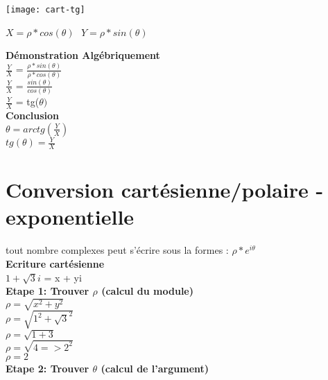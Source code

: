 \texttt{[image: cart-tg]}

$X=\rho * cos(\theta)$ $ $ $ Y=\rho * sin(\theta)$

\vspace{5mm} %
\textbf{Démonstration Algébriquement} \\

$\frac{Y}{X}$ = $\frac{\rho * sin(\theta)}{\rho * cos(\theta)}$ \\
$\frac{Y}{X}$ = $\frac{sin(\theta)}{cos(\theta)}$ \\
$\frac{Y}{X}$ = tg($\theta)$ \\

\vspace{5mm} %
\textbf{Conclusion} \\

$\theta = arctg(\frac{Y}{X})$ \\
$tg(\theta) = \frac{Y}{X}$ \\


\newpage

\section{Conversion cartésienne/polaire - exponentielle}
\vspace{3mm} %

tout nombre complexes peut s'écrire sous la formes : $\rho * e^{i\theta}$ \\

\textbf{Ecriture cartésienne} \\

$1+\sqrt{3}i$ = x + yi \\

\vspace{5mm}
\textbf{Etape 1: Trouver $\rho$ (calcul du module)} \\

$\rho = \sqrt{x^{2} + y^{2}}$ \\

$\rho = \sqrt{1^{2} + \sqrt{3}^{2}}$ \\

$\rho = \sqrt{1 + 3}$ \\

$\rho = \sqrt{4 => 2^{2}}$ \\

$\rho = 2$ \\

\vspace{5mm}
\textbf{Etape 2: Trouver $\theta$ (calcul de l'argument)} \\

